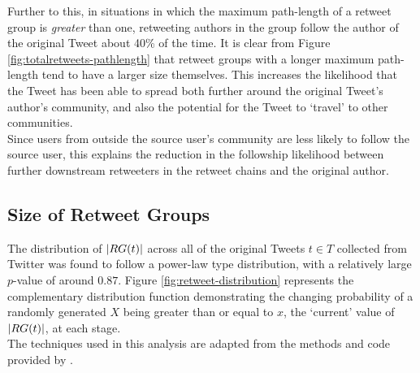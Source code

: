 Further to this, in situations in which the maximum path-length of a retweet group is \textit{greater} than one, retweeting authors in the group follow the author of the original Tweet about 40\% of the time. It is clear from Figure \ref{fig:totalretweets-pathlength} that retweet groups with a longer maximum path-length tend to have a larger size themselves. This increases the likelihood that the Tweet has been able to spread both further around the original Tweet's author's community, and also the potential for the Tweet to `travel' to other communities.\\
Since users from outside the source user's community are less likely to follow the source user, this explains the reduction in the followship likelihood between further downstream retweeters in the retweet chains and the original author.


\subsection{Size of Retweet Groups}
The distribution of $|RG(t)|$ across all of the original Tweets $t \in T$ collected from Twitter was found to follow a power-law type distribution, with a relatively large $p$-value of around $0.87$. Figure \ref{fig:retweet-distribution} represents the complementary distribution function demonstrating the changing probability of a randomly generated $X$ being greater than or equal to $x$, the `current' value of $|RG(t)|$, at each stage.\\
The techniques used in this analysis are adapted from the methods and code provided by \cite{clauset07}.

